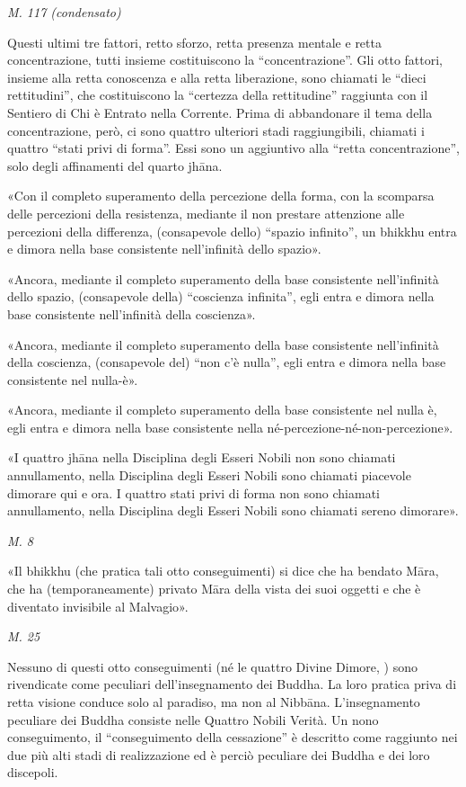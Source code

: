 \emph{M. 117 (condensato)}


 Questi ultimi tre fattori, retto sforzo, retta
presenza mentale e retta concentrazione, tutti insieme costituiscono la
“concentrazione”. Gli otto fattori, insieme alla retta conoscenza e alla
retta liberazione, sono chiamati le “dieci rettitudini”, che
costituiscono la “certezza della rettitudine” raggiunta con il Sentiero
di Chi è Entrato nella Corrente. Prima di abbandonare il tema della
concentrazione, però, ci sono quattro ulteriori stadi raggiungibili,
chiamati i quattro “stati privi di forma”. Essi sono un aggiuntivo alla
“retta concentrazione”, solo degli affinamenti del quarto jhāna.


 «Con il completo superamento della percezione della forma,
con la scomparsa delle percezioni della resistenza, mediante il non
prestare attenzione alle percezioni della differenza, (consapevole
dello) “spazio infinito”, un bhikkhu entra e dimora nella base
consistente nell’infinità dello spazio».


«Ancora, mediante il completo superamento della base consistente
nell’infinità dello spazio, (consapevole della) “coscienza infinita”,
egli entra e dimora nella base consistente nell’infinità della
coscienza».


«Ancora, mediante il completo superamento della base consistente
nell’infinità della coscienza, (consapevole del) “non c’è nulla”, egli
entra e dimora nella base consistente nel nulla-è».


«Ancora, mediante il completo superamento della base consistente nel
nulla è, egli entra e dimora nella base consistente nella
né-percezione-né-non-percezione».


«I quattro jhāna nella Disciplina degli Esseri Nobili non sono chiamati
annullamento, nella Disciplina degli Esseri Nobili sono chiamati
piacevole dimorare qui e ora. I quattro stati privi di forma non sono
chiamati annullamento, nella Disciplina degli Esseri Nobili sono
chiamati sereno dimorare».


\emph{M. 8}


«Il bhikkhu (che pratica tali otto conseguimenti) si dice che ha bendato
Māra, che ha (temporaneamente) privato Māra della vista dei suoi oggetti
e che è diventato invisibile al Malvagio».


\emph{M. 25}


 Nessuno di questi otto conseguimenti (né le quattro
Divine Dimore, \hyperlink{cap-10-Il-periodo-di-mezzo#pag200b}{}) sono rivendicate come peculiari
dell’insegnamento dei Buddha. La loro pratica priva di retta visione
conduce solo al paradiso, ma non al Nibbāna. L’insegnamento peculiare
dei Buddha consiste nelle Quattro Nobili Verità. Un nono conseguimento, il
“conseguimento della cessazione” è descritto come raggiunto nei due più
alti stadi di realizzazione ed è perciò peculiare dei Buddha e dei loro
discepoli.


